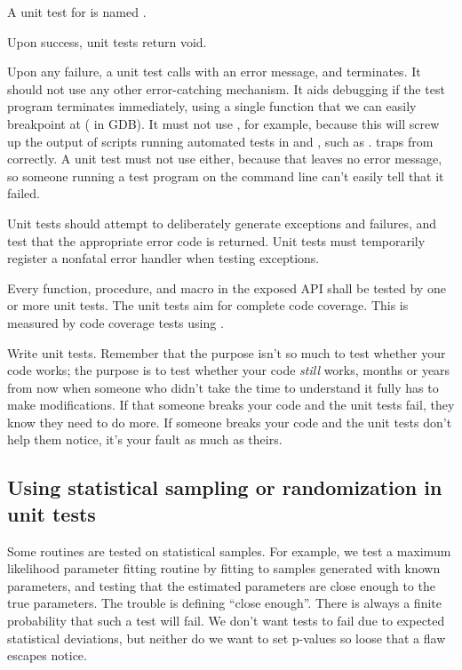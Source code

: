 A unit test for  is named . 

Upon success, unit tests return void.

Upon any failure, a unit test calls  with an error
message, and terminates. It should not use any other error-catching
mechanism. It aids debugging if the test program terminates
immediately, using a single function that we can easily breakpoint at
( in GDB). It must not use ,
for example, because this will screw up the output of scripts running
automated tests in  and , such as
.  traps  from
 correctly. A unit test must not use
 either, because that leaves no error message, so
someone running a test program on the command line can't easily tell
that it failed.

Unit tests should attempt to deliberately generate exceptions and
failures, and test that the appropriate error code is returned.  Unit
tests must temporarily register a nonfatal error handler when testing
exceptions. 

Every function, procedure, and macro in the exposed API shall be
tested by one or more unit tests. The unit tests aim for complete code
coverage. This is measured by code coverage tests using .

Write unit tests. Remember that the purpose isn't so much to test
whether your code works; the purpose is to test whether your code
\emph{still} works, months or years from now when someone who didn't
take the time to understand it fully has to make modifications. If
that someone breaks your code and the unit tests fail, they know they
need to do more. If someone breaks your code and the unit tests don't
help them notice, it's your fault as much as theirs.


\subsection{Using statistical sampling or randomization in unit tests}

Some routines are tested on statistical samples. For example, we test
a maximum likelihood parameter fitting routine by fitting to samples
generated with known parameters, and testing that the estimated
parameters are close enough to the true parameters.  The trouble is
defining ``close enough''. There is always a finite probability that
such a test will fail. We don't want tests to fail due to expected
statistical deviations, but neither do we want to set p-values so
loose that a flaw escapes notice.

